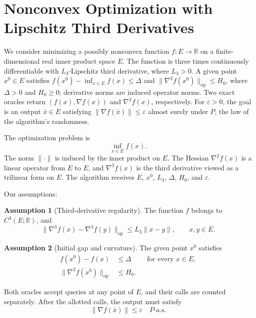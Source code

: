 \documentclass[10pt]{article}
\theoremstyle{definition}
\newtheorem{assumption}{Assumption}
\begin{document}
\section*{Nonconvex Optimization with Lipschitz Third Derivatives}
We consider minimizing a possibly nonconvex function $f:E\to\mathbb{R}$ on a finite-dimensional real inner product space $E$. The function is three times continuously differentiable with $L_3$-Lipschitz third derivative, where $L_3>0$. A given point $x^0\in E$ satisfies $f(x^0)-\inf_{x\in E}f(x)\leq\Delta$ and $\|\nabla^2 f(x^0)\|_{\mathrm{op}}\leq H_0$, where $\Delta>0$ and $H_0\geq0$; derivative norms are induced operator norms. Two exact oracles return $(f(x),\nabla f(x))$ and $\nabla^2 f(x)$, respectively. For $\varepsilon>0$, the goal is an output $\bar{x}\in E$ satisfying $\|\nabla f(\bar{x})\|\leq\varepsilon$ almost surely under $P$, the law of the algorithm's randomness.

The optimization problem is
\[
\inf_{x\in E} f(x).
\]
The norm $\|\cdot\|$ is induced by the inner product on $E$. The Hessian $\nabla^2 f(x)$ is a linear operator from $E$ to $E$, and $\nabla^3 f(x)$ is the third derivative viewed as a trilinear form on $E$. The algorithm receives $E$, $x^0$, $L_3$, $\Delta$, $H_0$, and $\varepsilon$.

Our assumptions:
\begin{assumption}[Third-derivative regularity]
The function $f$ belongs to $C^3(E;\mathbb{R})$, and
\[
\|\nabla^3 f(x)-\nabla^3 f(y)\|_{\mathrm{op}}
\leq L_3\|x-y\|,
\qquad x,y\in E.
\]
\end{assumption}

\begin{assumption}[Initial gap and curvature]
The given point $x^0$ satisfies
\[
\begin{aligned}
f(x^0)-f(x)&\leq\Delta &&\text{for every }x\in E,\\
\|\nabla^2 f(x^0)\|_{\mathrm{op}}&\leq H_0.
\end{aligned}
\]
\end{assumption}

Both oracles accept queries at any point of $E$, and their calls are counted separately. After the allotted calls, the output must satisfy
\[
\|\nabla f(\bar{x})\|\leq\varepsilon
\quad P\text{-a.s.}
\]
\end{document}
